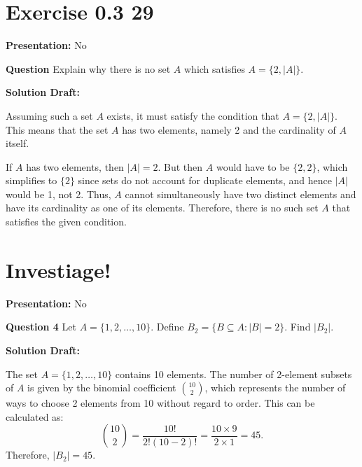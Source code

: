 \documentclass{article}
\begin{document}
\section*{Exercise 0.3 29}  

\noindent\textbf{Presentation:} No

\vspace{0.5cm} %

\noindent\textbf{Question}
Explain why there is no set \( A \) which satisfies \( A = \{2, |A|\} \).

\vspace{0.5cm} %

\noindent\textbf{Solution Draft:}

Assuming such a set \( A \) exists, it must satisfy the condition that \( A = \{2, |A|\} \). This means that the set \( A \) has two elements, namely 2 and the cardinality of \( A \) itself. 

If \( A \) has two elements, then \( |A| = 2 \). But then \( A \) would have to be \( \{2, 2\} \), which simplifies to \( \{2\} \) since sets do not account for duplicate elements, and hence \( |A| \) would be 1, not 2. Thus, \( A \) cannot simultaneously have two distinct elements and have its cardinality as one of its elements. Therefore, there is no such set \( A \) that satisfies the given condition.


\section*{Investiage!}


\noindent\textbf{Presentation:} No

\vspace{0.5cm} %

\noindent\textbf{Question 4}
Let \( A = \{1,2,\ldots,10\} \). Define \( B_2 = \{B \subseteq A : |B| = 2\} \). Find \( |B_2| \).

\vspace{0.5cm} %

\noindent\textbf{Solution Draft:}

The set \( A = \{1,2,\ldots,10\} \) contains 10 elements. The number of 2-element subsets of \( A \) is given by the binomial coefficient \(\binom{10}{2}\), which represents the number of ways to choose 2 elements from 10 without regard to order. This can be calculated as:
\[
\binom{10}{2} = \frac{10!}{2!(10-2)!} = \frac{10 \times 9}{2 \times 1} = 45.
\]
Therefore, \( |B_2| = 45 \).
\end{document}
